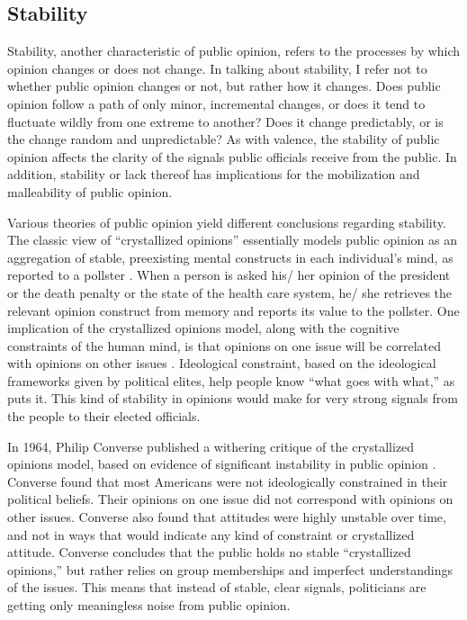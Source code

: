 \subsection*{Stability}
Stability, another characteristic of public opinion, refers to the processes by which opinion changes or does not change. In talking about stability, I refer not to whether public opinion changes or not, but rather how it changes. Does public opinion follow a path of only minor, incremental changes, or does it tend to fluctuate wildly from one extreme to another? Does it change predictably, or is the change random and unpredictable? As with valence, the stability of public opinion affects the clarity of the signals public officials receive from the public. In addition, stability or lack thereof has implications for the mobilization and malleability of public opinion.

Various theories of public opinion yield different conclusions regarding stability. The classic view of ``crystallized opinions'' essentially models public opinion as an aggregation of stable, preexisting mental constructs in each individual's mind, as reported to a pollster \citep{Converse1964,Kinder1983,Kinder1998}. When a person is asked his/ her opinion of the president or the death penalty or the state of the health care system, he/ she retrieves the relevant opinion construct from memory and reports its value to the pollster. One implication of the crystallized opinions model, along with the cognitive constraints of the human mind, is that opinions on one issue will be correlated with opinions on other issues \citep{Kinder1983}. Ideological constraint, based on the ideological frameworks given by political elites, help people know ``what goes with what,'' as \citet{Converse1964} puts it. This kind of stability in opinions would make for very strong signals from the people to their elected officials.

In 1964, Philip Converse \nocite{Converse1964} published a withering critique of the crystallized opinions model, based on evidence of significant instability in public opinion \citep[see also][]{Kinder1983}. Converse found that most Americans were not ideologically constrained in their political beliefs. Their opinions on one issue did not correspond with opinions on other issues. Converse also found that attitudes were highly unstable over time, and not in ways that would indicate any kind of constraint or crystallized attitude. Converse concludes that the public holds no stable ``crystallized opinions,'' but rather relies on group memberships and imperfect understandings of the issues. This means that instead of stable, clear signals, politicians are getting only meaningless noise from public opinion.

